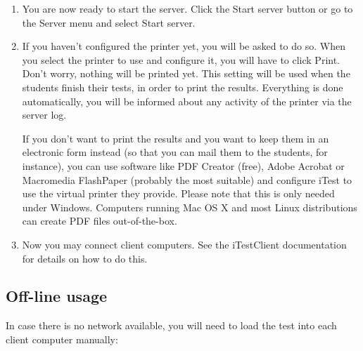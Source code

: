 \begin{enumerate}
\item You are now ready to start the server.
Click the Start server button or go to the Server menu and select Start server.

\item If you haven't configured the printer yet, you will be asked to do so.
When you select the printer to use and configure it, you will have to click Print.
Don't worry, nothing will be printed yet.
This setting will be used when the students finish their tests, in order to print the results.
Everything is done automatically, you will be informed about any activity of the printer via the server log.

If you don't want to print the results and you want to keep them in an electronic form instead (so that you can mail them to the students, for instance), you can use software like PDF Creator (free), Adobe Acrobat or Macromedia FlashPaper (probably the most suitable) and configure iTest to use the virtual printer they provide.
Please note that this is only needed under Windows.
Computers running Mac OS X and most Linux distributions can create PDF files out-of-the-box.

\item Now you may connect client computers.
See the iTestClient documentation for details on how to do this.
\end{enumerate}

\subsection{Off-line usage}

In case there is no network available, you will need to load the test into each client computer manually:

